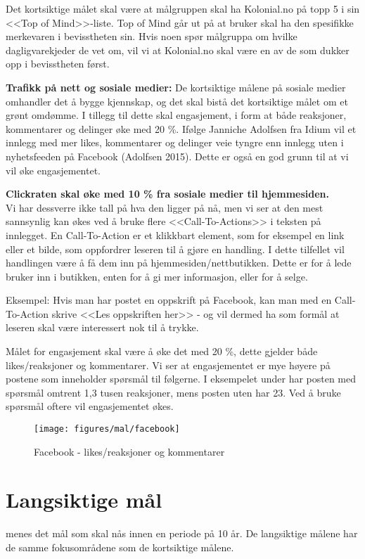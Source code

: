 Det kortsiktige målet skal være at målgruppen skal ha Kolonial.no på topp 5 i sin <<Top of Mind>>-liste. Top of Mind går ut på at bruker skal ha den spesifikke merkevaren i bevisstheten sin. Hvis noen spør målgruppa om hvilke dagligvarekjeder de vet om, vil vi at Kolonial.no skal være en av de som dukker opp i bevisstheten først.

\textbf{Trafikk på nett og sosiale medier:}
De kortsiktige målene på sosiale medier omhandler det å bygge kjennskap, og det skal bistå det kortsiktige målet om et grønt omdømme. I tillegg til dette skal engasjement, i form at både reaksjoner, kommentarer og delinger øke med 20 \%. Ifølge Janniche Adolfsen fra Idium vil et innlegg med mer likes, kommentarer og delinger veie tyngre enn innlegg uten i nyhetsfeeden på Facebook (Adolfsen 2015). Dette er også en god grunn til at vi vil øke engasjementet.

\textbf{Clickraten skal øke med 10 \% fra sosiale medier til hjemmesiden.}
\\Vi har dessverre ikke tall på hva den ligger på nå, men vi ser at den mest sannsynlig kan økes ved å bruke flere <<Call-To-Actions>> i teksten på innlegget. En Call-To-Action er et klikkbart element, som for eksempel en link eller et bilde, som oppfordrer leseren til å gjøre en handling. I dette tilfellet vil handlingen være å få dem inn på hjemmesiden/nettbutikken. Dette er for å lede bruker inn i butikken, enten for å gi mer informasjon, eller for å selge. 

Eksempel: Hvis man har postet en oppskrift på Facebook, kan man med en Call-To-Action skrive <<Les oppskriften her>> - og vil dermed ha som formål at leseren skal være interessert nok til å trykke. 


Målet for engasjement skal være å øke det med 20 \%, dette gjelder både likes/reaksjoner og kommentarer. Vi ser at engasjementet er mye høyere på postene som inneholder spørsmål til følgerne. I eksempelet under har posten med spørsmål omtrent 1,3 tusen reaksjoner, mens posten uten har 23. Ved å bruke spørsmål oftere vil engasjementet økes. 

\begin{figure}[!htbp] 
    \centering
    \texttt{[image: figures/mal/facebook]}
    \caption[Mål - likes]{Facebook - likes/reaksjoner og kommentarer
    \label{fig:facebook}}
\end{figure}

\section{\textbf{Langsiktige mål}}
 menes det mål som skal nås innen en periode på 10 år. De langsiktige målene har de samme fokusområdene som de kortsiktige målene. 

